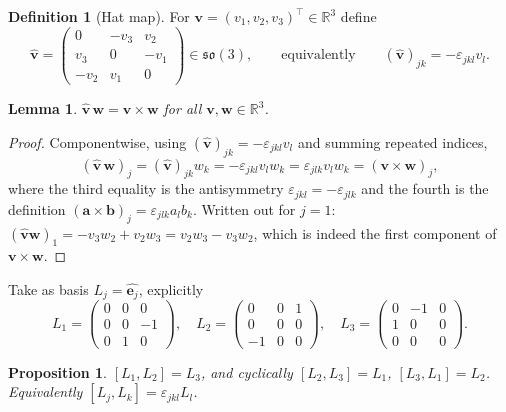 \documentclass[11pt]{article}
\newcommand{\so}{\mathfrak{so}}
\newcommand{\R}{\mathbb{R}}
\newcommand{\vv}[1]{\bm{#1}}
\newcommand{\hatmap}[1]{\widehat{#1}}
\theoremstyle{plain}
\newtheorem{proposition}[theorem]{Proposition}
\newtheorem{lemma}[theorem]{Lemma}
\theoremstyle{definition}
\newtheorem{definition}[theorem]{Definition}
\begin{document}
\begin{definition}[Hat map]
For $\vv v=(v_1,v_2,v_3)^{\!\top}\in\R^3$ define
\[
\hatmap{\vv v}=\begin{pmatrix}0&-v_3&v_2\\ v_3&0&-v_1\\ -v_2&v_1&0\end{pmatrix}\in\so(3),
\qquad\text{equivalently}\qquad (\hatmap{\vv v})_{jk}=-\varepsilon_{jkl}v_l .
\]
\end{definition}

\begin{lemma}\label{lem:hatcross}
$\hatmap{\vv v}\,\vv w=\vv v\times\vv w$ for all $\vv v,\vv w\in\R^3$.
\end{lemma}

\begin{proof}
Componentwise, using $(\hatmap{\vv v})_{jk}=-\varepsilon_{jkl}v_l$ and summing repeated indices,
\[
(\hatmap{\vv v}\,\vv w)_j=(\hatmap{\vv v})_{jk}w_k=-\varepsilon_{jkl}v_lw_k
=\varepsilon_{jlk}v_lw_k=(\vv v\times\vv w)_j ,
\]
where the third equality is the antisymmetry $\varepsilon_{jkl}=-\varepsilon_{jlk}$ and the fourth
is the definition $(\vv a\times\vv b)_j=\varepsilon_{jlk}a_lb_k$. Written out for $j=1$:
$(\hatmap{\vv v}\vv w)_1=-v_3w_2+v_2w_3=v_2w_3-v_3w_2$, which is indeed the first component of
$\vv v\times\vv w$.
\end{proof}

Take as basis $L_j=\hatmap{\vv e_j}$, explicitly
\[
L_1=\begin{pmatrix}0&0&0\\0&0&-1\\0&1&0\end{pmatrix},\quad
L_2=\begin{pmatrix}0&0&1\\0&0&0\\-1&0&0\end{pmatrix},\quad
L_3=\begin{pmatrix}0&-1&0\\1&0&0\\0&0&0\end{pmatrix}.
\]

\begin{proposition}\label{prop:sobrackets}
$[L_1,L_2]=L_3$, and cyclically $[L_2,L_3]=L_1$, $[L_3,L_1]=L_2$. Equivalently
$[L_j,L_k]=\varepsilon_{jkl}L_l$.
\end{proposition}
\end{document}
